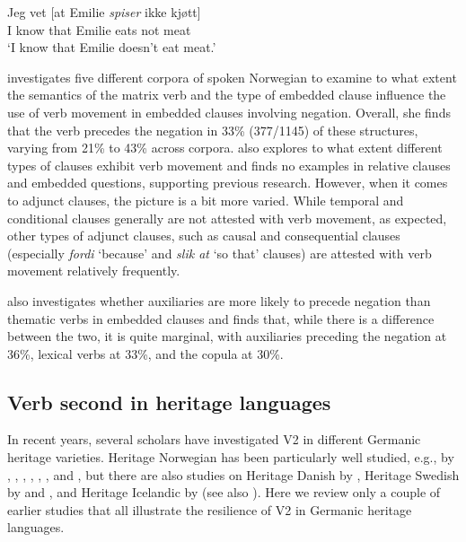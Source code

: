 \documentclass[output=paper]{langscibook}
\begin{document}
\ea%
    \label{ex:anderssen:6}
\gll Jeg vet    [at    Emilie \textit{spiser} ikke kjøtt]\\
      I     know that Emilie eats     not  meat\\
\glt ‘I know that Emilie doesn’t eat meat.’
\z

\citet{Ringstad2019} investigates five different corpora of spoken Norwegian to examine to what extent the semantics of the matrix verb and the type of embedded clause influence the use of verb movement in embedded clauses involving negation. Overall, she finds that the verb precedes the negation in 33\% (377/1145) of these structures, varying from 21\% to 43\% across corpora. \citet{Ringstad2019} also explores to what extent different types of clauses exhibit verb movement and finds no examples in relative clauses and embedded questions, supporting previous research. However, when it comes to adjunct clauses, the picture is a bit more varied. While temporal and conditional clauses generally are not attested with verb movement, as expected, other types of adjunct clauses, such as causal and consequential clauses (especially \textit{fordi} ‘because’ and \textit{slik at} ‘so that’ clauses) are attested with verb movement relatively frequently. 

\citet{Ringstad2019} also investigates whether auxiliaries are more likely to precede negation than thematic verbs in embedded clauses and finds that, while there is a difference between the two, it is quite marginal, with auxiliaries preceding the negation at 36\%, lexical verbs at 33\%, and the copula at 30\%. 

\subsection{Verb second in heritage languages}%
\label{sec:anderssen:2.2}
In recent years, several scholars have investigated V2 in different Germanic heritage varieties. Heritage Norwegian has been particularly well studied, e.g., by \citet{Strømsvåg2013}, \citet{EideHjelde2015Verb, EideHjelde2018}, \citet{Johannessen2015Germanic}, \citet{Khayitova2016}, \citet{AlexiadouLohndal2018}, \citet{WestergaardLohndal2019}, \citet{LundquistEtAl2020} and \citet{WestergaardLohndalLundquist2021}, but there are also studies on Heritage Danish by \citet{KühlHeegård2018}, Heritage Swedish by \citet{LarssonJohannessen2015Embedded,LarssonJohannessen2015Incomplete} and \citet{LarssonKinn2022}, and Heritage Icelandic by \citet{ArnbjoernsdottirEtAl2018} (see also \citealt{Angantysson2023}). Here we review only a couple of earlier studies that all illustrate the resilience of V2 in Germanic heritage languages.
\end{document}
